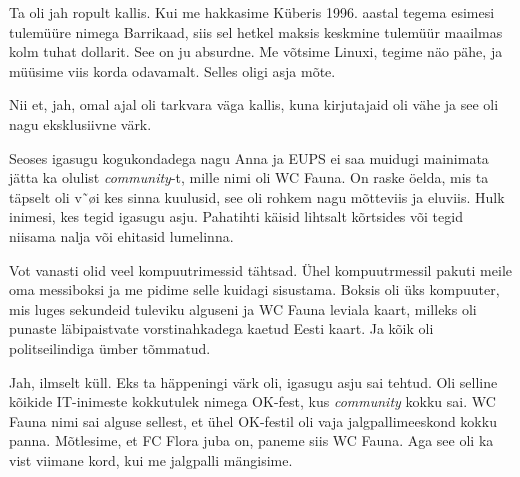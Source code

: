 Ta oli jah ropult kallis. Kui me hakkasime Küberis 1996. aastal tegema  esimesi tulemüüre nimega Barrikaad,  siis sel hetkel maksis keskmine tulemüür maailmas kolm tuhat dollarit. See on ju absurdne. Me võtsime Linuxi, tegime näo pähe, ja müüsime viis korda odavamalt. Selles oligi asja mõte. 

Nii et, jah, omal ajal oli tarkvara väga kallis, kuna kirjutajaid oli vähe ja see oli nagu eksklusiivne värk. 

Seoses igasugu kogukondadega nagu Anna ja EUPS ei saa muidugi mainimata jätta ka olulist \emph{community}-t, mille nimi oli WC Fauna. On raske öelda, mis ta täpselt oli v˜øi kes sinna kuulusid, see oli rohkem nagu mõtteviis ja eluviis. Hulk inimesi, kes tegid igasugu asju. Pahatihti käisid  lihtsalt kõrtsides või tegid niisama nalja või ehitasid lumelinna.

Vot vanasti olid veel kompuutrimessid tähtsad. Ühel kompuutrmessil pakuti meile oma messiboksi ja me pidime selle kuidagi sisustama. Boksis oli üks kompuuter, mis luges sekundeid tuleviku alguseni ja WC Fauna leviala kaart, milleks oli punaste läbipaistvate vorstinahkadega kaetud Eesti kaart. Ja kõik oli politseilindiga ümber tõmmatud. 


Jah, ilmselt küll. Eks ta häppeningi värk oli, igasugu asju sai tehtud. Oli selline kõikide IT-inimeste kokkutulek nimega OK-fest, kus \emph{community} kokku sai. WC Fauna nimi sai alguse sellest, et ühel OK-festil oli vaja jalgpallimeeskond kokku panna. Mõtlesime, et FC Flora juba on, paneme siis WC Fauna. Aga see oli ka vist viimane kord, kui me jalgpalli mängisime. 

